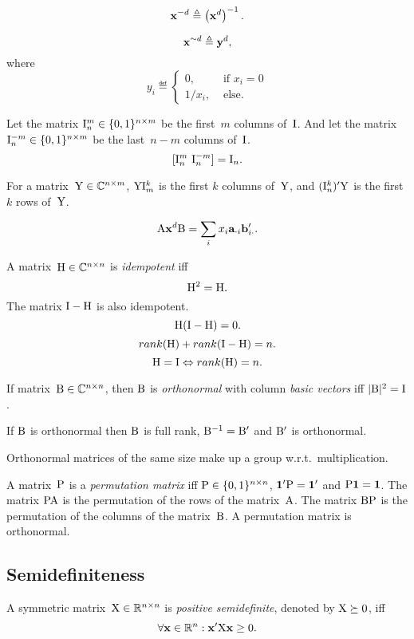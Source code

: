 \documentclass[10pt,a4paper]{article}
\theoremstyle{plain} \newtheorem{Lem}{Lemma}
\begin{document}
$$ \mathbf x^{-d} \triangleq \left(\mathbf x^d \right)^{-1}. $$

$$ \mathbf x^{\sim d} \triangleq \mathbf y^d, $$
where
\begin{equation*}
  y_i \eqdef
  \begin{cases}
     0, &\text{ if } x_i = 0\\
     1/x_i,   &\text{ else.}
  \end{cases}
\end{equation*}

Let the matrix $\mathrm I_n^m \in \{0,1\}^{n \times m}$ be the first~$m$ columns of~$\mathrm I$.
And let the matrix $\mathrm I_n^{-m} \in \{0,1\}^{n \times m}$ be the last~$n-m$ columns of~$\mathrm I$.
$$ [\mathrm I_n^m \ \mathrm I_n^{-m}] = \mathrm I_n. $$

For a matrix~$\mathrm Y \in \mathbb C^{n \times m}$,
$\mathrm Y \mathrm I^k_m$ is the first $k$ columns of~$\mathrm Y$,
and
$(\mathrm I^k_n)' \mathrm Y$ is the first $k$ rows of~$\mathrm Y$.

$$\mathrm A \mathbf x^d \mathrm B = \sum_i x_i \mathbf a_{\cdot i} \mathbf b_{i \cdot}'. $$

A matrix~$\mathrm H \in \mathbb C^{n \times n}$ is {\em idempotent} iff
$$ \mathrm H^2 = \mathrm H. $$
The matrix $\mathrm I - \mathrm H$ is also idempotent.
$$ \mathrm H (\mathrm I - \mathrm H) = \mathrm 0. $$
$$ rank(\mathrm H) + rank(\mathrm I - \mathrm H) = n. $$
$$ \mathrm H = \mathrm I \Leftrightarrow rank(\mathrm H) = n. $$

{If matrix~$\mathrm B \in \mathbb C^{n \times n}$, then $\mathrm B$ is {\em orthonormal} with column {\em basic vectors} iff $|\mathrm B|^2 = \mathrm I$.
}

If $\mathrm B$ is orthonormal then $\mathrm B$ is full rank, $\mathrm B^{-1} = \mathrm B'$ and $\mathrm B'$ is orthonormal.

Orthonormal matrices of the same size make up a group w.r.t.~multiplication.

A matrix~$\mathrm P$ is a {\em permutation matrix}
iff $\mathrm P \in \{0,1\}^{n \times n}$, $\mathbf 1' \mathrm P = \mathbf 1'$ and $\mathrm P \mathbf 1 = \mathbf 1$.
The matrix $\mathrm P \mathrm A$ is the permutation of the rows of the matrix~$\mathrm A$.
The matrix $\mathrm B \mathrm P$ is the permutation of the columns of the matrix~$\mathrm B$.
A permutation matrix is orthonormal.



\subsection{Semidefiniteness}

A symmetric matrix~$\mathrm X \in \mathbb R^{n \times n}$ is {\em positive semidefinite}, denoted by $\mathrm X \succeq 0$, iff
$$\forall \mathbf x \in \mathbb R^n: \mathbf x' \mathrm X \mathbf x \ge 0. $$
\end{document}
